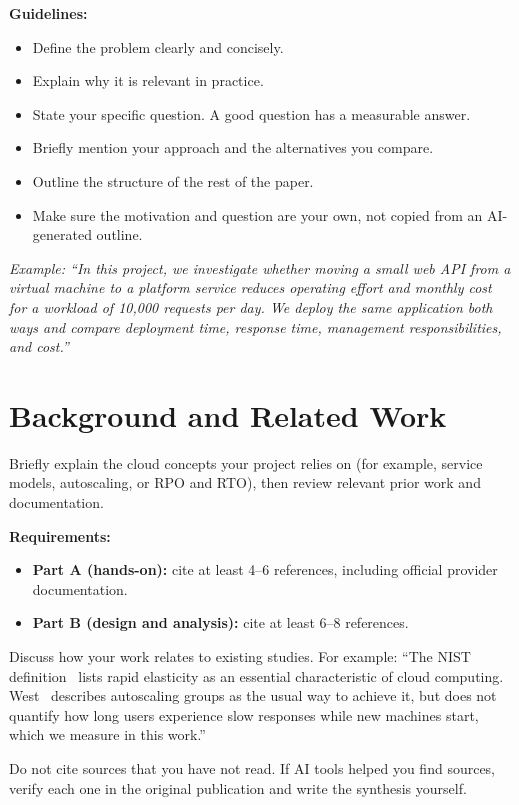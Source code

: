 \documentclass[conference,a4paper]{IEEEtran}
\begin{document}
	\textbf{Guidelines:}
	\begin{itemize}
		\item Define the problem clearly and concisely.
		\item Explain why it is relevant in practice.
		\item State your specific question. A good question has a measurable answer.
		\item Briefly mention your approach and the alternatives you compare.
		\item Outline the structure of the rest of the paper.
		\item Make sure the motivation and question are your own, not copied from an AI-generated outline.
	\end{itemize}
	
	\textit{Example: ``In this project, we investigate whether moving a small web API from a virtual machine to a platform service reduces operating effort and monthly cost for a workload of 10,000 requests per day. We deploy the same application both ways and compare deployment time, response time, management responsibilities, and cost.''}
	
	\section{Background and Related Work}
	\label{sec:related_work}
	
	Briefly explain the cloud concepts your project relies on (for example, service models, autoscaling, or RPO and RTO), then review relevant prior work and documentation.
	
	\textbf{Requirements:}
	\begin{itemize}
		\item \textbf{Part A (hands-on):} cite at least 4--6 references, including official provider documentation.
		\item \textbf{Part B (design and analysis):} cite at least 6--8 references.
	\end{itemize}
	
	Discuss how your work relates to existing studies. For example: ``The NIST definition~\cite{b1} lists rapid elasticity as an essential characteristic of cloud computing. West~\cite{b2} describes autoscaling groups as the usual way to achieve it, but does not quantify how long users experience slow responses while new machines start, which we measure in this work.''
	
	Do not cite sources that you have not read. If AI tools helped you find sources, verify each one in the original publication and write the synthesis yourself.
	
\end{document}
